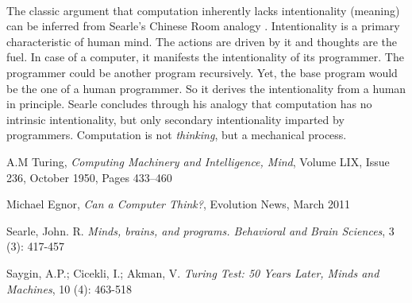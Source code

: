 \documentclass[a4paper]{article}
\begin{document}
	\paragraph{}
	The classic argument that computation inherently lacks intentionality (meaning) can be inferred from Searle's Chinese Room analogy \cite{searle80}. Intentionality is a primary characteristic of human mind. The actions are driven by it and thoughts are the fuel. In case of a computer, it manifests the intentionality of its programmer. The programmer could be another program recursively. Yet, the base program would be the one of a human programmer. So it derives the intentionality from a human in principle. Searle concludes through his analogy that computation has no intrinsic intentionality, but only secondary intentionality imparted by programmers. Computation is not \textit{thinking}, but a mechanical process. 
	\begin{thebibliography}{9}
		
		 A.M Turing,
		\textit{Computing Machinery and Intelligence, Mind},
		Volume LIX, Issue 236, October 1950, Pages 433–460
		
		Michael Egnor,
		\textit{Can a Computer Think?},
		Evolution News, March 2011
		
		Searle, John. R.
		\textit{Minds, brains, and programs. Behavioral and Brain Sciences},
		3 (3): 417-457
		
		Saygin, A.P.; Cicekli, I.; Akman, V.
		\textit{Turing Test: 50 Years Later, Minds and Machines},
		10 (4): 463-518
		
	\end{thebibliography}
	
\end{document}

